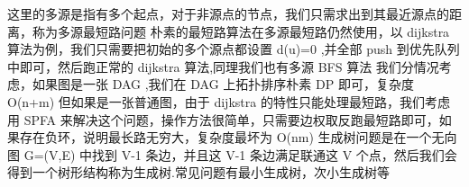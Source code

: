 {}\markdownRendererInterblockSeparator
{}
\markdownRendererSectionEnd \markdownRendererSectionBegin
{}\markdownRendererInterblockSeparator
{}\markdownRendererInterblockSeparator
{}
\markdownRendererSectionEnd 
\markdownRendererSectionEnd \markdownRendererSectionBegin
{}\markdownRendererInterblockSeparator
{}这里的多源是指有多个起点，对于非源点的节点，我们只需求出到其最近源点的距离，称为多源最短路问题\markdownRendererParagraphSeparator
{}朴素的最短路算法在多源最短路仍然使用，以\markdownRendererDollarSign{} dijkstra \markdownRendererDollarSign{}算法为例，我们只需要把初始的多个源点都设置\markdownRendererDollarSign{} d(u)=0 \markdownRendererDollarSign{},并全部\markdownRendererDollarSign{} push \markdownRendererDollarSign{}到优先队列中即可，然后跑正常的\markdownRendererDollarSign{} dijkstra \markdownRendererDollarSign{}算法,同理我们也有多源\markdownRendererDollarSign{} BFS \markdownRendererDollarSign{}算法\markdownRendererInterblockSeparator
{}
\markdownRendererSectionEnd \markdownRendererSectionBegin
{}\markdownRendererInterblockSeparator
{}我们分情况考虑，如果图是一张\markdownRendererDollarSign{} DAG \markdownRendererDollarSign{},我们在\markdownRendererDollarSign{} DAG \markdownRendererDollarSign{}上拓扑排序朴素\markdownRendererDollarSign{} DP \markdownRendererDollarSign{}即可，复杂度\markdownRendererDollarSign{} O(n+m) \markdownRendererDollarSign{}\markdownRendererParagraphSeparator
{}但如果是一张普通图，由于 \markdownRendererDollarSign{}dijkstra\markdownRendererDollarSign{} 的特性只能处理最短路，我们考虑用 \markdownRendererDollarSign{}SPFA\markdownRendererDollarSign{} 来解决这个问题，操作方法很简单，只需要边权取反跑最短路即可，如果存在负环，说明最长路无穷大，复杂度最坏为 \markdownRendererDollarSign{}O(nm)\markdownRendererDollarSign{}\markdownRendererInterblockSeparator
{}
\markdownRendererSectionEnd 
\markdownRendererSectionEnd \markdownRendererSectionBegin
{}\markdownRendererInterblockSeparator
{}生成树问题是在一个无向图\markdownRendererDollarSign{} G=(V,E) \markdownRendererDollarSign{}中找到\markdownRendererDollarSign{} V-1 \markdownRendererDollarSign{}条边，并且这\markdownRendererDollarSign{} V-1 \markdownRendererDollarSign{}条边满足联通这\markdownRendererDollarSign{} V \markdownRendererDollarSign{}个点，然后我们会得到一个树形结构称为生成树.常见问题有最小生成树，次小生成树等\markdownRendererInterblockSeparator
